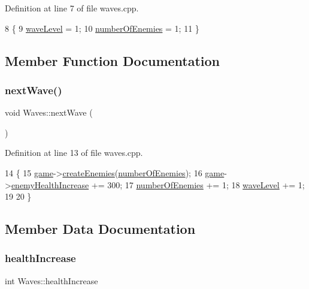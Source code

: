 Definition at line 7 of file waves.\+cpp.


\begin{DoxyCode}
8 \{
9     \hyperlink{class_waves_abfdc18a5f2f185285173797c1c67c6f9}{waveLevel} = 1;
10     \hyperlink{class_waves_a5539b3131120a19665884a63b6e9c029}{numberOfEnemies} = 1;
11 \}
\end{DoxyCode}


\subsection{Member Function Documentation}
\mbox{\label{class_waves_a1f686101089cb63743c8f50047b28716}} 
\subsubsection{\texorpdfstring{next\+Wave()}{nextWave()}}
{\footnotesize\ttfamily void Waves\+::next\+Wave (\begin{DoxyParamCaption}{ }\end{DoxyParamCaption})}



Definition at line 13 of file waves.\+cpp.


\begin{DoxyCode}
14 \{
15     \hyperlink{waves_8cpp_a58bdb5643d0814ac4e697a1564b79b70}{game}->\hyperlink{class_game_a622303239641db82911ea67bde3ba1a0}{createEnemies}(\hyperlink{class_waves_a5539b3131120a19665884a63b6e9c029}{numberOfEnemies});
16     \hyperlink{waves_8cpp_a58bdb5643d0814ac4e697a1564b79b70}{game}->\hyperlink{class_game_ac0038cbbcfbd5d8b32600cd9f42cd09b}{enemyHealthIncrease} += 300;
17     \hyperlink{class_waves_a5539b3131120a19665884a63b6e9c029}{numberOfEnemies} += 1;
18     \hyperlink{class_waves_abfdc18a5f2f185285173797c1c67c6f9}{waveLevel} += 1;
19 
20 \}
\end{DoxyCode}


\subsection{Member Data Documentation}
\mbox{\label{class_waves_abefbb124b85fea1246f41390b12a0f99}} 
\subsubsection{\texorpdfstring{health\+Increase}{healthIncrease}}
{\footnotesize\ttfamily int Waves\+::health\+Increase}



